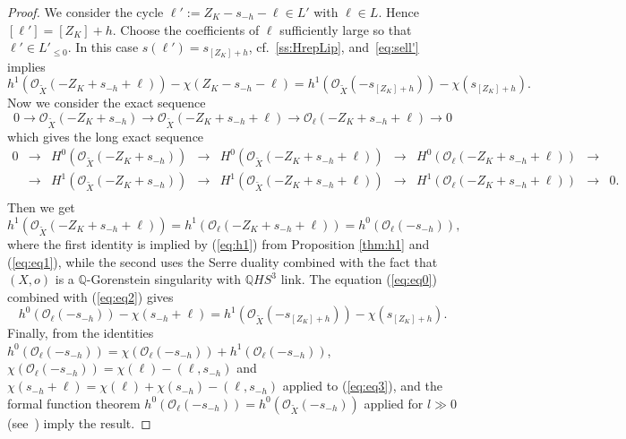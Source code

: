 \documentclass[12pt,a4paper]{amsart}
\def\cO{\mathcal{O}}
\theoremstyle{remark}
\theoremstyle{definition}
\begin{document}
\begin{proof}
    We consider the cycle $\ell':=Z_K-s_{-h}-\ell\in L'$ with $\ell\in L$. Hence $[\ell']=[Z_K]+h$.
Choose the coefficients of $\ell$ sufficiently large so that $\ell'\in L'_{\leq 0}$.
In this case $s(\ell')=s_{[Z_K]+h}$, cf.~\ref{ss:HrepLip}, and~\eqref{eq:sell'} implies 
\begin{equation}\label{eq:eq0}
h^1(\cO_{{\tilde X}}(-Z_K+s_{-h}+\ell))-\chi(Z_K-s_{-h}-\ell)= h^1(\cO_{{\tilde X}}(-s_{[Z_K]+h}))-\chi(s_{[Z_K]+h}).
\end{equation}
Now we consider the exact sequence 
$$0\to \cO_{{\tilde X}}(-Z_K+s_{-h})\to
\cO_{{\tilde X}}(-Z_K+s_{-h}+\ell)\to
\cO_{\ell}(-Z_K+s_{-h}+\ell)\to 0$$
which gives the long exact sequence 
{\footnotesize
\begin{equation}\label{eq:eq1}
\begin{array}{ccccccccc}
0 & \to & H^0(\cO_{{\tilde X}}(-Z_K+s_{-h})) & \to &
H^0(\cO_{{\tilde X}}(-Z_K+s_{-h}+\ell)) & \to &
 H^0(\cO_{\ell}(-Z_K+s_{-h}+\ell)) &\to & \\
 & \to & H^1(\cO_{{\tilde X}}(-Z_K+s_{-h})) & \to & H^1(\cO_{{\tilde X}}(-Z_K+s_{-h}+\ell)) & \to &
 H^1(\cO_{\ell}(-Z_K+s_{-h}+\ell)) &\to & 0.\\
\end{array} 
\end{equation}}
Then  we get 
\begin{equation}\label{eq:eq2}
h^1(\cO_{{\tilde X}}(-Z_K+s_{-h}+\ell))=h^1(\cO_{\ell}(-Z_K+s_{-h}+\ell))=h^0(\cO_{\ell}(-s_{-h})),
\end{equation}
where the first identity is implied by (\ref{eq:h1}) from Proposition \ref{thm:h1} and (\ref{eq:eq1}), while the second uses the Serre duality combined with the fact that $(X,o)$ is a $\mathbb{Q}$-Gorenstein singularity with $\mathbb{Q}HS^3$ link. The equation (\ref{eq:eq0}) combined with (\ref{eq:eq2}) gives 
\begin{equation}\label{eq:eq3}
h^0(\cO_{\ell}(-s_{-h}))-\chi(s_{-h}+\ell)= h^1(\cO_{{\tilde X}}(-s_{[Z_K]+h}))-\chi(s_{[Z_K]+h}).
\end{equation}
Finally, from the identities 
 $h^0(\cO_{\ell}(-s_{-h}))=\chi(\cO_{\ell}(-s_{-h}))+h^1(\cO_{\ell}(-s_{-h}))$, $\chi(\cO_{\ell}(-s_{-h}))=\chi(\ell)-(\ell, s_{-h})$ and $\chi(s_{-h}+\ell)=\chi(\ell)+\chi(s_{-h})-(\ell,s_{-h})$  
 applied to (\ref{eq:eq3}),  and  the formal function theorem
 $h^0(\cO_{\ell}(-s_{-h}))=h^0(\cO_{\tilde{X}}(-s_{-h}))$ applied for 
 $l\gg 0$ 
(see~\cite{GriffithsHarris}) imply the result.
\end{proof}
\end{document}
